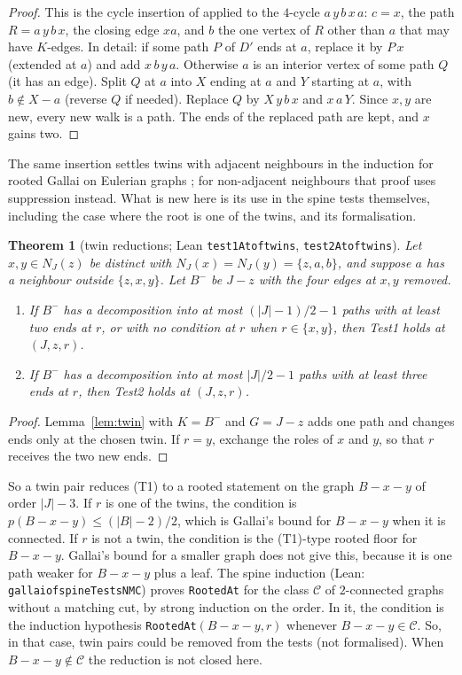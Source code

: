 \documentclass[11pt]{amsart}
\newtheorem{theorem}{Theorem}[section]
\theoremstyle{definition}
\theoremstyle{remark}
\renewcommand{\_}{\oldunderscore\allowbreak}
\newcommand{\lean}[1]{\textup{(Lean: {\small\texttt{#1}})}}
\begin{document}
\begin{proof}
This is the cycle insertion of \cite[Lemma~5.2]{EC} applied to the $4$-cycle $a\,y\,b\,x\,a$:
$c=x$, the path $R=a\,y\,b\,x$, the closing edge $xa$, and $b$ the one vertex of $R$ other than $a$
that may have $K$-edges. In detail: if some path $P$ of $D'$ ends at $a$, replace it by $P\,x$
(extended at $a$) and add $x\,b\,y\,a$. Otherwise $a$ is an interior vertex of some path $Q$ (it
has an edge). Split $Q$ at $a$ into $X$ ending at $a$ and $Y$ starting at $a$, with $b\notin X-a$
(reverse $Q$ if needed). Replace $Q$ by $X\,y\,b\,x$ and $x\,a\,Y$. Since $x,y$ are new, every new
walk is a path. The ends of the replaced path are kept, and $x$ gains two.
\end{proof}

The same insertion settles twins with adjacent neighbours in the induction for rooted Gallai on
Eulerian graphs \cite[Proposition~5.5]{EC}; for non-adjacent neighbours that proof uses
suppression instead. What is new here is its use in the spine tests themselves, including the
case where the root is one of the twins, and its formalisation.

\begin{theorem}[twin reductions; Lean \texttt{test1At\_of\_twins}, \texttt{test2At\_of\_twins}]
\label{thm:twinred}
Let $x,y\in N_J(z)$ be distinct with $N_J(x)=N_J(y)=\{z,a,b\}$, and suppose $a$ has a neighbour
outside $\{z,x,y\}$. Let $B^-$ be $J-z$ with the four edges at $x,y$ removed.
\begin{enumerate}[label=(\alph*)]
\item If $B^-$ has a decomposition into at most $(|J|-1)/2-1$ paths with at least two ends at $r$,
or with no condition at $r$ when $r\in\{x,y\}$, then Test1 holds at $(J,z,r)$.
\item If $B^-$ has a decomposition into at most $|J|/2-1$ paths with at least three ends at $r$,
then Test2 holds at $(J,z,r)$.
\end{enumerate}
\end{theorem}

\begin{proof}
Lemma~\ref{lem:twin} with $K=B^-$ and $G=J-z$ adds one path and changes ends only at the chosen
twin. If $r=y$, exchange the roles of $x$ and $y$, so that $r$ receives the two new ends.
\end{proof}

So a twin pair reduces (T1) to a rooted statement on the graph $B-x-y$ of order $|J|-3$. If $r$ is
one of the twins, the condition is $p(B-x-y)\le(|B|-2)/2$, which is Gallai's bound for $B-x-y$ when
it is connected. If $r$ is not a twin, the condition is the (T1)-type rooted floor for $B-x-y$.
Gallai's bound for a smaller graph does not give this, because it is one path weaker for
$B-x-y$ plus a leaf. The spine induction \lean{gallai\_of\_spineTestsNMC} proves \texttt{RootedAt}
for the class $\mathcal C$ of $2$-connected graphs without a matching cut, by strong induction on the
order. In it, the condition is the induction hypothesis \texttt{RootedAt}$(B-x-y,r)$ whenever
$B-x-y\in\mathcal C$. So, in that case, twin pairs could be removed from the tests (not formalised).
When $B-x-y\notin\mathcal C$ the reduction is not closed here.
\end{document}
